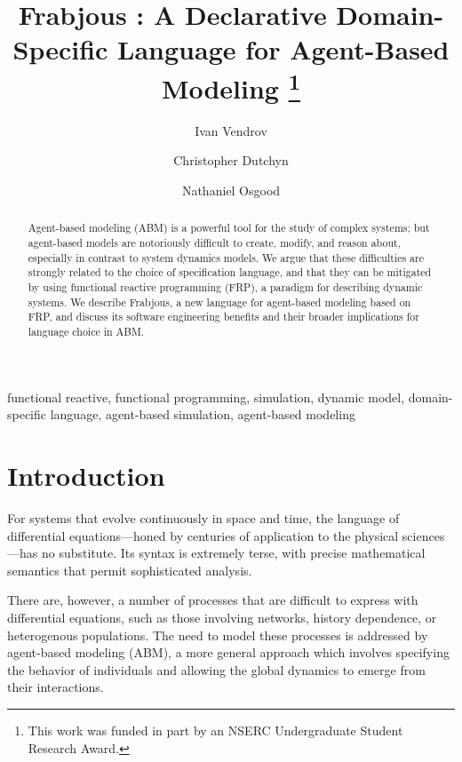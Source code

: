 \documentclass[oribibl]{llncs}
\begin{document}
\lstset{language=Haskell}
%

\title{Frabjous : A Declarative Domain-Specific Language for Agent-Based Modeling \thanks{This work was funded in part by an NSERC Undergraduate Student Research Award.}}


\author{Ivan Vendrov \and Christopher Dutchyn \and Nathaniel Osgood}

\maketitle
\begin{abstract}
Agent-based modeling (ABM) is a powerful tool for the study of complex systems; but agent-based models are notoriously difficult to create, modify, and reason about, especially in contrast to system dynamics models. We argue that these difficulties are strongly related to the choice of specification language, and that they can be mitigated by using functional reactive programming (FRP), a paradigm for describing dynamic systems. We describe Frabjous, a new language for agent-based modeling based on FRP, and discuss its software engineering benefits and their broader implications for language choice in ABM. 
\end{abstract}

\keywords
functional reactive, functional programming, simulation, dynamic model, domain-specific language, agent-based simulation, agent-based modeling

\section{Introduction}

For systems that evolve continuously in space and time, the language of differential equations---honed by centuries of application to the physical sciences---has no substitute. Its syntax is extremely terse, with precise mathematical semantics that permit sophisticated analysis. 

There are, however, a number of processes that are difficult to express with differential equations, such as those involving networks, history dependence, or heterogenous populations\cite{network_structure,system_dyn_tradeoffs}. The need to model these processes is addressed by agent-based modeling (ABM), a more general approach which involves specifying the behavior of individuals and allowing the global dynamics to emerge from their interactions.
  
\end{document}
